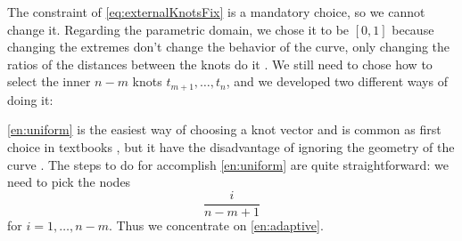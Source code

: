 \documentclass[dissertation.tex]{subfiles}
\begin{document}
The constraint of \cref{eq:externalKnotsFix} is a mandatory
choice, so we cannot change it. Regarding the parametric domain, we
chose it to be $[0,1]$ because changing the extremes don't change
the behavior of the curve, only changing the ratios of the distances
between the knots do it \cite{farin}. We still need to chose how to select 
the inner $n-m$ knots $t_{m+1},\dots,t_n$, and we developed two different
ways of doing it:

\cref{en:uniform} is the easiest way of choosing a knot vector
and is common as first choice in textbooks \cite{farin}\cite{docarmo},
but it have the disadvantage of ignoring the geometry of the curve
\cite{farin}. The steps to do for accomplish \cref{en:uniform} are quite
straightforward: we need to pick the nodes
\begin{equation*}
  \frac{i}{n-m+1}
\end{equation*}
for $i=1,\dots,n-m$. Thus we concentrate on \cref{en:adaptive}.
\end{document}
